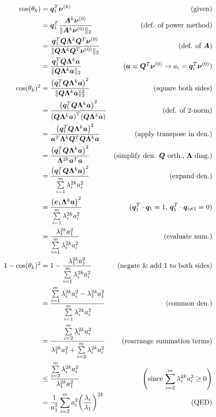 \documentclass[twoside,10pt]{article}
\begin{document}
\begin{align*}
  \cos(\theta_k) &= \vct{q}_1^{T} \vct{\nu}^{(k)}&\text{(given)}\\
  &= \vct{q}_1^{T} \frac{\mtx{A}^k \vct{\nu}^{(0)}}{\|\mtx{A}^k \vct{\nu}^{(0)}\|_2}&\text{(def. of power method)}\\
  &= \frac{\vct{q}_1^{T} \mtx{Q}\mtx{\Lambda}^k\mtx{Q}^T \vct{\nu}^{(0)}}{\|\mtx{Q}\mtx{\Lambda}^k\mtx{Q}^T \vct{\nu}^{(0)}\|_2}&\text{(def. of $\mtx{A}$)}\\
  &= \frac{\vct{q}_1^{T} \mtx{Q}\mtx{\Lambda}^k\vct{a}}{\|\mtx{Q}\mtx{\Lambda}^k\vct{a}\|_2}&\text{($\vct{a} \equiv \mtx{Q}^T\vct{\nu}^{(0)} \rightarrow a_i = \vct{q}_i^T \vct{\nu}^{(0)}$)}\\
  \cos(\theta_k)^2 &= \frac{\left(\vct{q}_1^{T} \mtx{Q}\mtx{\Lambda}^k\vct{a}\right)^2}{\|\mtx{Q}\mtx{\Lambda}^k\vct{a}\|_2^2}&\text{(square both sides)}\\
  &= \frac{\left(\vct{q}_1^{T} \mtx{Q}\mtx{\Lambda}^k\vct{a}\right)^2}{\left(\mtx{Q}\mtx{\Lambda}^k\vct{a}\right)^T\left(\mtx{Q}\mtx{\Lambda}^k\vct{a}\right)}&\text{(def. of 2-norm)}\\
  &= \frac{\left(\vct{q}_1^{T} \mtx{Q}\mtx{\Lambda}^k\vct{a}\right)^2}{\vct{a}^T\mtx{\Lambda}^k\mtx{Q}^T\mtx{Q}\mtx{\Lambda}^k\vct{a}}&\text{(apply transpose in den.)}\\
  &= \frac{\left(\vct{q}_1^{T} \mtx{Q}\mtx{\Lambda}^k\vct{a}\right)^2}{\mtx{\Lambda}^{2k}\vct{a}^T\vct{a}}&\text{(simplify den. $\mtx{Q}$ orth., $\mtx{\Lambda}$ diag.)}\\
  &= \frac{\left(\vct{q}_1^{T} \mtx{Q}\mtx{\Lambda}^k\vct{a}\right)^2}{\sum\limits_{i=1}^m{\lambda_i^{2k} a_i^2}}&\text{(expand den.)}\\
  &= \frac{\left(\vct{e}_1\mtx{\Lambda}^k\vct{a}\right)^2}{\sum\limits_{i=1}^m{\lambda_i^{2k} a_i^2}}&\text{($\vct{q}_1^T\cdot\vct{q}_1 = 1$, $\vct{q}_1^T\cdot\vct{q}_{i \neq 1} = 0$)}\\
  &= \frac{\lambda_1^{2k} a_1^2}{\sum\limits_{i=1}^m{\lambda_i^{2k} a_i^2}}&\text{(evaluate num.)}\\
  1 - \cos(\theta_k)^2 &= 1 - \frac{\lambda_1^{2k} a_1^2}{\sum\limits_{i=1}^m{\lambda_i^{2k} a_i^2}}&\text{(negate \& add 1 to both sides)}\\
  &= \frac{\sum\limits_{i=1}^m{\lambda_i^{2k} a_i^2} - \lambda_1^{2k} a_1^2}{\sum\limits_{i=1}^m{\lambda_i^{2k} a_i^2}}&\text{(common den.)}\\
  &= \frac{\sum\limits_{i=2}^m{\lambda_i^{2k}a_i^2}}{\lambda_1^{2k} a_1^2 + \sum\limits_{i=2}^m \lambda_i^{2k} a_i^2}&\text{(rearrange summation terms)}\\
  &\leq \frac{\sum\limits_{i=2}^m{\lambda_i^{2k}a_i^2}}{\lambda_1^{2k} a_1^2}&\left(\text{since $\sum\limits_{i=2}^m \lambda_i^{2k} a_i^2 \geq 0$}\right)\\
  &= \frac{1}{a_1^2} \sum\limits_{i=2}^m a_i^2 \left(\frac{\lambda_i}{\lambda_1}\right)^{2k}&\text{(QED)}\\
\end{align*}
\end{document}
